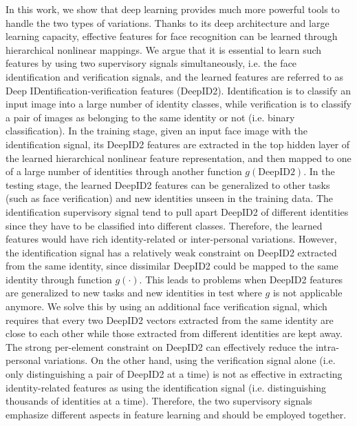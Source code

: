\documentclass{article} %
\begin{document}
In this work, we show that deep learning provides much more powerful tools to handle the two types of variations. Thanks to its deep architecture and large learning capacity, effective features for face recognition can be learned through hierarchical nonlinear mappings. We argue that it is essential to learn such features by using two supervisory signals simultaneously, i.e. the face identification and verification signals, and the learned features are referred to as Deep IDentification-verification features (DeepID2). Identification is to classify an input image into a large number of identity classes, while verification is to classify a pair of images as belonging to the same identity or not (i.e. binary classification). In the training stage, given an input face image with the identification signal, its DeepID2 features are extracted in the top hidden layer of the learned hierarchical nonlinear feature representation, and then mapped to one of a large number of identities through another function $g(\textrm{DeepID2})$. In the testing stage, the learned DeepID2 features can be generalized to other tasks (such as face verification) and new identities unseen in the training data. The identification supervisory signal tend to pull apart DeepID2 of different identities since they have to be classified into different classes. Therefore, the learned features would have rich identity-related or inter-personal variations. However, the identification signal has a relatively weak constraint on DeepID2 extracted from the same identity, since dissimilar DeepID2 could be mapped to the same identity through function $g(\cdot)$. This leads to problems when DeepID2 features are generalized to new tasks and new identities in test where $g$ is not applicable anymore. We solve this by using an additional face verification signal, which requires that every two DeepID2 vectors extracted from the same identity are close to each other while those extracted from different identities are kept away. The strong per-element constraint on DeepID2 can effectively reduce the intra-personal variations.
On the other hand, using the verification signal alone (i.e. only distinguishing a pair of DeepID2 at a time) is not as effective in extracting identity-related features as using the identification signal (i.e. distinguishing thousands of identities at a time).  Therefore, the two supervisory signals emphasize different aspects in feature learning and should be employed together.
\end{document}
